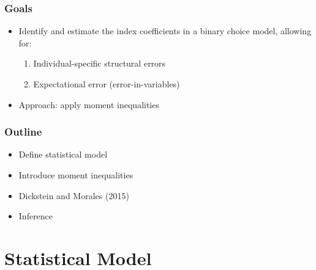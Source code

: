 
\begin{frame}
\frametitle{Goals}

\begin{itemize}
\item Identify and estimate the index coefficients in a binary choice model,
allowing for: 

\begin{enumerate}
\item Individual-specific structural errors 

\item Expectational error (error-in-variables) 
\end{enumerate}

\item Approach: apply moment inequalities
\end{itemize}
\end{frame}


\begin{frame}
\frametitle{Outline}

\begin{itemize}
\item Define statistical model

\item Introduce moment inequalities

\item Dickstein and Morales (2015)

\item Inference
\end{itemize}
\end{frame}


\section{Statistical Model}


